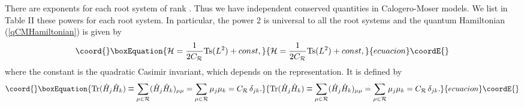 \documentclass[a4paper,12pt]{article}
\begin{document}
There are \coordHE{} exponents for each root system
\myHighlight{\(\Delta\)}\coordHE{} of rank \coordHE{}. Thus we have \coordHE{}
independent conserved quantities
in Calogero-Moser models. We list in Table II these powers for each root
system.
In particular, the power 2 is universal to all the root systems and
the quantum Hamiltonian (\ref{qCMHamiltonian}) is given by
\begin{equation}\coord{}\boxEquation{
   {\cal H} = {1\over {2 C_{\cal R}}}\mbox{Ts}(L^{2}) +
   const,
   \label{L2Ham}
}{
   {\cal H} = {1\over {2 C_{\cal R}}}\mbox{Ts}(L^{2}) +
   const,
   }{ecuacion}\coordE{}\end{equation}
where the constant \coordHE{} is the quadratic Casimir invariant, which
depends on the
 representation. It is
defined by
\begin{equation}\coord{}\boxEquation{
   \mbox{Tr}(\hat{H}_{j}\hat{H}_{k})
   \equiv\sum_{\mu\in{\cal R}}(\hat{H}_{j}\hat{H}_{k})_{\mu\mu}
   =\sum_{\mu\in{\cal R}}\mu_{j}\mu_{k}
   =C_{\cal R}\,\delta_{jk}.
}{
   \mbox{Tr}(\hat{H}_{j}\hat{H}_{k})
   \equiv\sum_{\mu\in{\cal R}}(\hat{H}_{j}\hat{H}_{k})_{\mu\mu}
   =\sum_{\mu\in{\cal R}}\mu_{j}\mu_{k}
   =C_{\cal R}\,\delta_{jk}.
}{ecuacion}\coordE{}\end{equation}
\end{document}
